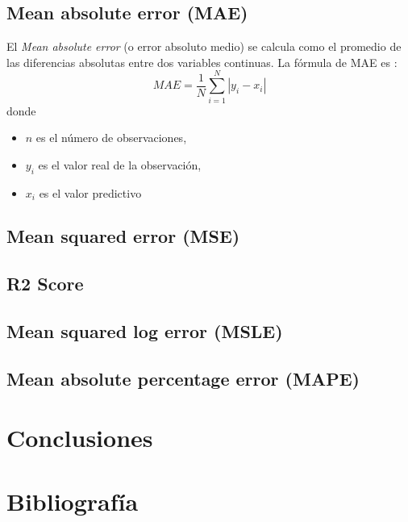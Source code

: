 \documentclass[12pt,a4paper,Spanish]{article}
\begin{document}
\subsection{Mean absolute error (MAE)}
El \textit{Mean absolute error} (o error absoluto medio) se calcula como el promedio de las diferencias absolutas entre dos variables continuas. La fórmula de MAE es \cite{eswiki:146234007}:
\begin{equation}
	MAE = \frac{1}{N} \sum_{i=1}^{N} |y_i - x_i|
\end{equation}
donde
\begin{itemize}
	\item $n$ es el número de observaciones,
	\item $y_i$ es el valor real de la observación,
	\item $x_i$ es el valor predictivo
\end{itemize}

\subsection{Mean squared error (MSE)}

\subsection{R2 Score}
\subsection{Mean squared log error (MSLE)}
\subsection{Mean absolute percentage error (MAPE)}

\newpage
\section{Conclusiones}








\newpage
\section{Bibliografía}
\printbibliography
\end{document}
